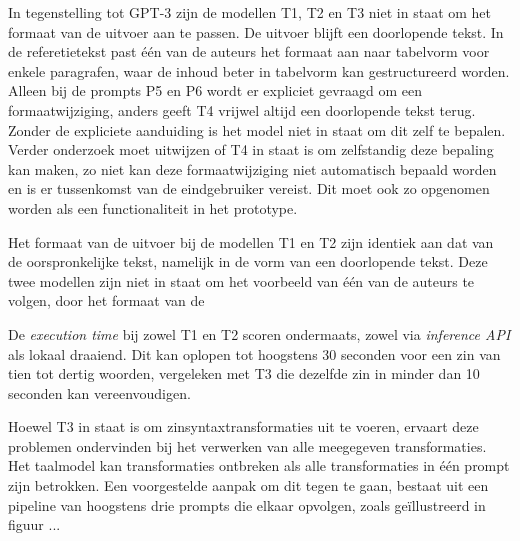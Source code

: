 \medspace

In tegenstelling tot GPT-3 zijn de modellen T1, T2 en T3 niet in staat om het formaat van de uitvoer aan te passen. De uitvoer blijft een doorlopende tekst. In de referetietekst past één van de auteurs het formaat aan naar tabelvorm voor enkele paragrafen, waar de inhoud beter in tabelvorm kan gestructureerd worden. Alleen bij de prompts P5 en P6 wordt er expliciet gevraagd om een formaatwijziging, anders geeft T4 vrijwel altijd een doorlopende tekst terug. Zonder de expliciete aanduiding is het model niet in staat om dit zelf te bepalen. Verder onderzoek moet uitwijzen of T4 in staat is om zelfstandig deze bepaling kan maken, zo niet kan deze formaatwijziging niet automatisch bepaald worden en is er tussenkomst van de eindgebruiker vereist. Dit moet ook zo opgenomen worden als een functionaliteit in het prototype.

Het formaat van de uitvoer bij de modellen T1 en T2 zijn identiek aan dat van de oorspronkelijke tekst, namelijk in de vorm van een doorlopende tekst. Deze twee modellen zijn niet in staat om het voorbeeld van één van de auteurs te volgen, door het formaat van de 

\medspace

De \textit{execution time} bij zowel T1 en T2 scoren ondermaats, zowel via \textit{inference API} als lokaal draaiend. Dit kan oplopen tot hoogstens 30 seconden voor een zin van tien tot dertig woorden, vergeleken met T3 die dezelfde zin in minder dan 10 seconden kan vereenvoudigen.

\medspace

Hoewel T3 in staat is om zinsyntaxtransformaties uit te voeren, ervaart deze problemen ondervinden bij het verwerken van alle meegegeven transformaties. Het taalmodel kan transformaties ontbreken als alle transformaties in één prompt zijn betrokken. Een voorgestelde aanpak om dit tegen te gaan, bestaat uit een pipeline van hoogstens drie prompts die elkaar opvolgen, zoals geïllustreerd in figuur ...

\medspace


